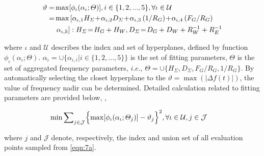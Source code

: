 \documentclass[lettersize,journal]{IEEEtran}
\def\code#1{\texttt{#1}}
\begin{document}
\vspace{-0.125in}
\begin{small} \begin{align}
	\vartheta =& \max[\phi_{\iota}({\alpha}_{\iota}; \varTheta)],i\in\{1,2,...,5\},\forall \iota\in\mathcal{U} \label{eqn:15} \\
			=&\max\left[\alpha_{\iota,1} H_{\varSigma} \!+\!\alpha_{\iota,2}
D_{\varSigma} \!+\! \alpha_{\iota,3} \left({1}/{R_{G}}\right)\!+\!\alpha_{\iota,4} \left({F_{G}}/{R_{G}}\right)\right.\notag \\
& \left. \alpha_{\iota,5}\right]:H_{\varSigma} \!=\! H_{G} + H_{W}, D_{\varSigma} \!=\! D_{G}+D_{W}+{ R_{W}^{-1} } + { R_{E}^{-1}} \notag
\end{align} \end{small}

\noindent where \(\iota\) and \(\mathcal{U}\) describes the index and set of hyperplanes, defined by function \(\phi_{\iota}(\alpha_{\iota};\varTheta)\). \(\alpha_{\iota}=\cup\{\alpha_{\iota, i}|i\in\{1,2,...,5\}\}\) is the set of fitting parameters, \(\varTheta\) is the set of aggregated frequency parameters, $i.e.$, \(\varTheta=\cup \{H_{\varSigma},D_{\varSigma},F_{G}/R_{G},1/R_{G}\}\). By automatically selecting the closet hyperplane to the \(\vartheta=\max ( |\varDelta f(t)| )\), the value of frequency nadir can be determined. Detailed calculation related to fitting parameters are provided below, \cite{9765359},

\vspace{-0.125in}
\begin{small} \begin{align}
	\min & \sum\nolimits_{j\in\mathcal{J}} \Bigl\{\max[\phi_{\iota}(\alpha_{\iota}; \varTheta_{j})]- \vartheta _{j}\Bigr\} ^{2}, \forall \iota\in\mathcal{U}, j\in\mathcal{J} \label{eqn:16}
\end{align} \end{small}

\noindent where $j$ and $\mathcal{J}$ denote, respectively, the index and union set of all evaluation points sampled from \eqref{eqn:7a}.

\end{document}
